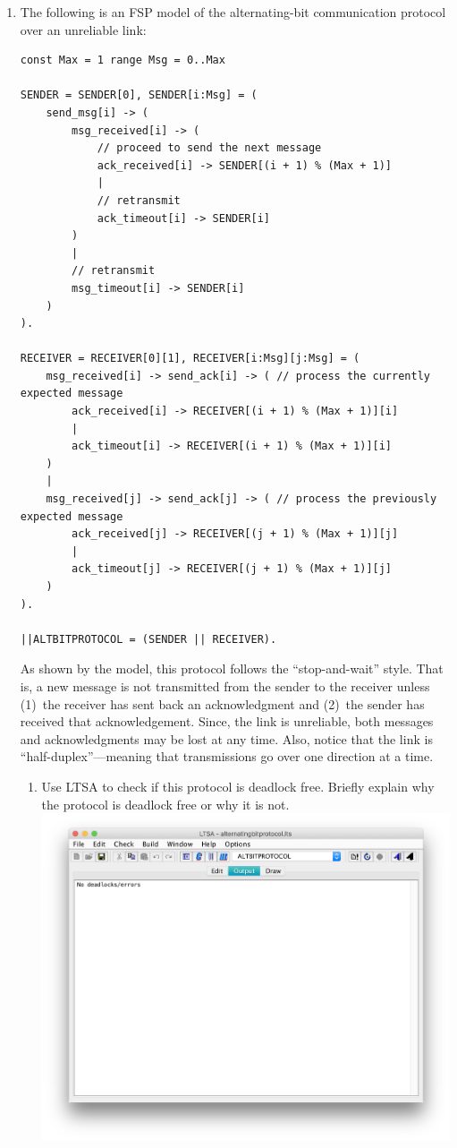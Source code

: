\documentclass{article}
\begin{document}
\begin{enumerate}
\item The following is an FSP model of the alternating-bit communication protocol
over an unreliable link:

\begin{small}
\begin{verbatim}
const Max = 1 range Msg = 0..Max

SENDER = SENDER[0], SENDER[i:Msg] = (
    send_msg[i] -> (
        msg_received[i] -> (
            // proceed to send the next message
            ack_received[i] -> SENDER[(i + 1) % (Max + 1)]
            |
            // retransmit
            ack_timeout[i] -> SENDER[i]
        )
        |
        // retransmit
        msg_timeout[i] -> SENDER[i]
    )
).

RECEIVER = RECEIVER[0][1], RECEIVER[i:Msg][j:Msg] = (
    msg_received[i] -> send_ack[i] -> ( // process the currently expected message
        ack_received[i] -> RECEIVER[(i + 1) % (Max + 1)][i]
        |
        ack_timeout[i] -> RECEIVER[(i + 1) % (Max + 1)][i]
    )
    |
    msg_received[j] -> send_ack[j] -> ( // process the previously expected message
        ack_received[j] -> RECEIVER[(j + 1) % (Max + 1)][j]
        |
        ack_timeout[j] -> RECEIVER[(j + 1) % (Max + 1)][j]
    )
).

||ALTBITPROTOCOL = (SENDER || RECEIVER).
\end{verbatim}
\end{small}

As shown by the model, this protocol follows the ``stop-and-wait''
style. That is, a new message is not transmitted from the sender to
the receiver unless (1)~the receiver has sent back an acknowledgment
and (2)~the sender has received that acknowledgement. Since, the
link is unreliable, both messages and acknowledgments may be lost at
any time. Also, notice that the link is ``half-duplex''---meaning
that transmissions go over one direction at a time.

\begin{enumerate}
\item Use LTSA to check if this protocol is deadlock free. Briefly explain why the protocol is deadlock free or why it is not. \\
\includegraphics[scale=0.5]{deadlocks.png}


\end{enumerate}
\end{enumerate}
\end{document}
